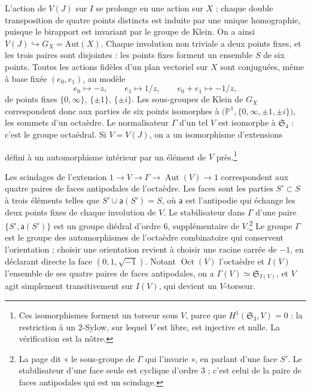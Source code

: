 \documentclass[11pt,a4paper]{article}
\begin{document}
L'action de $V(J)$ sur $I$ se prolonge en une action sur $X$ : chaque double
transposition de quatre points distincts est induite par une unique
homographie, puisque le birapport est invariant par le groupe de Klein. On a
ainsi $V(J) \hookrightarrow G_X = \mathrm{Aut}(X)$. Chaque involution non
triviale a deux points fixes, et les trois paires sont disjointes : les points
fixes forment un ensemble $S$ de six points. Toutes les actions fidèles d'un
plan vectoriel sur $X$ sont conjuguées, même à base fixée $(e_0, e_1)$, au
modèle
\[
e_0 \mapsto -z, \qquad e_1 \mapsto 1/z, \qquad e_0 + e_1 \mapsto -1/z,
\]
de points fixes $\{0,\infty\}$, $\{\pm 1\}$, $\{\pm i\}$. Les sous-groupes de
Klein de $G_X$ correspondent donc aux parties de six points isomorphes à
$\bigl(\mathbb{P}^{1}, \{0,\infty,\pm 1,\pm i\}\bigr)$, les sommets d'un
octaèdre. Le normalisateur $\Gamma$ d'un tel $V$ est isomorphe à
$\mathfrak{S}_4$ : c'est le groupe octaédral. Si $V = V(J)$, on a un
isomorphisme d'extensions


défini à un automorphisme intérieur par un élément de $V$ près.\footnote{Ces
isomorphismes forment un torseur sous $V$, parce que $H^{1}(\mathfrak{S}_3,
V) = 0$ : la restriction à un $2$-Sylow, sur lequel $V$ est libre, est
injective et nulle. La vérification est la nôtre.}

Les scindages de l'extension $1 \to V \to \Gamma \to \operatorname{Aut}(V) \to
1$ correspondent aux quatre paires de faces antipodales de l'octaèdre. Les
faces sont les parties $S' \subset S$ à trois éléments telles que
$S' \cup \mathsf{a}(S') = S$, où $\mathsf{a}$ est l'antipodie qui
échange les deux points fixes de chaque involution de $V$. Le stabilisateur
dans $\Gamma$ d'une paire $\{S', \mathsf{a}(S')\}$ est un groupe diédral
d'ordre $6$, supplémentaire de $V$.\footnote{La page dit « le sous-groupe de
$\Gamma$ qui l'invarie », en parlant d'une face $S'$. Le stabilisateur d'une
face seule est cyclique d'ordre $3$ ; c'est celui de la paire de faces
antipodales qui est un scindage.} Le groupe $\Gamma$ est le groupe des
automorphismes de l'octaèdre combinatoire qui conservent l'orientation ;
choisir une orientation revient à choisir une racine carrée de $-1$, en
déclarant directe la face $(0, 1, \sqrt{-1})$. Notant
$\operatorname{Oct}(V)$ l'octaèdre et $I(V)$ l'ensemble de ses quatre paires
de faces antipodales, on a $\Gamma(V) \simeq \mathfrak{S}_{I(V)}$, et $V$ agit
simplement transitivement sur $I(V)$, qui devient un $V$-torseur.
\end{document}

